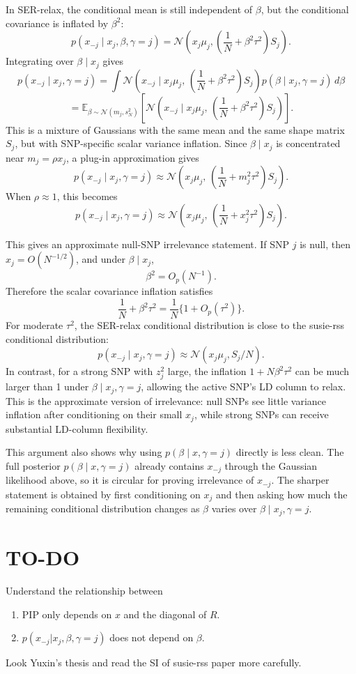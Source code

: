 \documentclass[11pt]{article}
\newcommand{\E}{\mathbb E}
\newcommand{\Normal}{\mathcal N}
\begin{document}
In SER-relax, the conditional mean is still independent of $\beta$, but the
conditional covariance is inflated by $\beta^2$:
\[
p(x_{-j}\mid x_j,\beta,\gamma=j)
=
\Normal\left(
x_j\mu_j,
\left(\frac{1}{N}+\beta^2\tau^2\right)S_j
\right).
\]
Integrating over $\beta\mid x_j$ gives
\[
p(x_{-j}\mid x_j,\gamma=j)
=
\int
\Normal\left(
x_{-j}\mid x_j\mu_j,\,
\left(\frac{1}{N}+\beta^2\tau^2\right)S_j
\right)
p(\beta\mid x_j,\gamma=j)\,d\beta
\]
\[
=
\E_{\beta\sim \Normal(m_j,s_N^2)}
\left[
\Normal\left(
x_{-j}\mid x_j\mu_j,\,
\left(\frac{1}{N}+\beta^2\tau^2\right)S_j
\right)
\right].
\]
This is a mixture of Gaussians with the same mean and the same shape matrix
$S_j$, but with SNP-specific scalar variance inflation. Since
$\beta\mid x_j$ is concentrated near $m_j=\rho x_j$, a plug-in approximation gives
\[
p(x_{-j}\mid x_j,\gamma=j)
\approx
\Normal\left(
x_j\mu_j,\,
\left(\frac{1}{N}+m_j^2\tau^2\right)S_j
\right).
\]
When $\rho\approx 1$, this becomes
\[
p(x_{-j}\mid x_j,\gamma=j)
\approx
\Normal\left(
x_j\mu_j,\,
\left(\frac{1}{N}+x_j^2\tau^2\right)S_j
\right).
\]

This gives an approximate null-SNP irrelevance statement. If SNP $j$ is null,
then $x_j=O(N^{-1/2})$, and under $\beta\mid x_j$,
\[
\beta^2 = O_p(N^{-1}).
\]
Therefore the scalar covariance inflation satisfies
\[
\frac{1}{N}+\beta^2\tau^2
=
\frac{1}{N}\{1+O_p(\tau^2)\}.
\]
For moderate $\tau^2$, the SER-relax conditional distribution is close to the
susie-rss conditional distribution:
\[
p(x_{-j}\mid x_j,\gamma=j)
\approx
\Normal(x_j\mu_j,S_j/N).
\]
In contrast, for a strong SNP with $z_j^2$ large, the inflation
$1+N\beta^2\tau^2$ can be much larger than 1 under
$\beta\mid x_j,\gamma=j$, allowing the active SNP's LD column to relax. This
is the approximate version of irrelevance: null SNPs see little variance
inflation after conditioning on their small $x_j$, while strong SNPs can
receive substantial LD-column flexibility.

This argument also shows why using $p(\beta\mid x,\gamma=j)$ directly is less
clean. The full posterior $p(\beta\mid x,\gamma=j)$ already contains
$x_{-j}$ through the Gaussian likelihood above, so it is circular for proving
irrelevance of $x_{-j}$. The sharper statement is obtained by first
conditioning on $x_j$ and then asking how much the remaining conditional
distribution changes as $\beta$ varies over
$\beta\mid x_j,\gamma=j$.

\section{TO-DO}
Understand the relationship between 
\begin{enumerate}
\item PIP only depends on $x$ and the diagonal of $R$.
\item $p(x_{-j} | x_j, \beta, \gamma = j)$ does not depend on $\beta$.
\end{enumerate}
Look Yuxin's thesis and read the SI of susie-rss paper more carefully.
\end{document}
